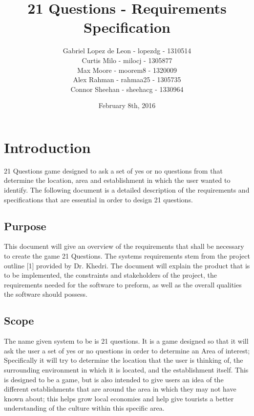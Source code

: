 \documentclass[titlepage]{article}
\title{\textbf{21 Questions - Requirements Specification}}
\author{Gabriel Lopez de Leon - lopezdg - 1310514\\Curtis Milo - milocj - 1305877\\Max Moore - moorem8 - 1320009\\Alex Rahman - rahmaa25 - 1305735\\Connor Sheehan - sheehacg - 1330964}
\date{February 8th, 2016}
\newcounter{req}
\begin{document}
	
	\maketitle
	\vspace{4cm}	
		\newpage
		\tableofcontents
		\newpage
		\section{Introduction}
		\label{sec:introduction}
		
		21 Questions game designed to ask a set of yes or no questions from that determine the location, area and establishment in which the user wanted to identify. The following document is a detailed description of the requirements and specifications that are essential in order to design 21 questions.
		
		\subsection{Purpose}
		\label{sub:purpose}
		
		This document will give an overview of the requirements that shall be necessary to create the game 21 Questions. The systems requirements stem from the project outline [1] provided by Dr. Khedri. The document will explain the product that is to be implemented, the constraints and stakeholders of the project, the requirements needed for the software to preform, as well as the overall qualities the software should possess.

		
		
		\subsection{Scope}
		\label{sub:scope}
		
		The name given system to be is 21 questions. It is a game designed so that it will ask the user a set of yes or no questions in order to determine an Area of interest; Specifically it will try to determine the location that the user is thinking of, the surrounding environment in which it is located, and the establishment itself. This is designed to be a game, but is also intended to give users an idea of the different establishments that are around the area in which they may not have known about; this helps grow local economies and help give tourists a better understanding of the culture within this specific area. 
		
\end{document}
